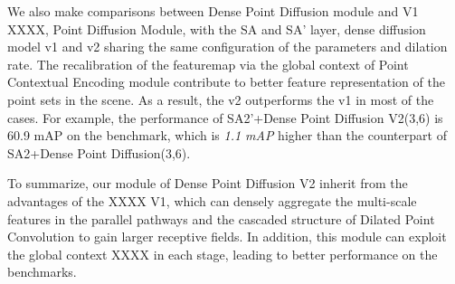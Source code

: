 \documentclass[runningheads]{llncs}
\begin{document}
We also make comparisons between Dense Point Diffusion module and V1 XXXX, Point Diffusion Module, with the SA and SA' layer, dense diffusion model v1 and v2 sharing the same configuration of the parameters and dilation rate. The  recalibration of  the  featuremap via the global context of  Point Contextual Encoding module  contribute to better feature representation of the point sets in the scene. As a result, the v2 outperforms the v1 in most of the cases. For example, the performance of SA2'+Dense Point Diffusion V2(3,6) is 60.9 mAP on the benchmark, which is \emph{1.1 mAP} higher than the counterpart of SA2+Dense Point Diffusion(3,6).





To summarize, our module of Dense Point Diffusion V2 inherit  from the advantages  of the XXXX V1,  which can densely aggregate the multi-scale features in the parallel pathways and the cascaded structure of Dilated Point Convolution to gain larger receptive fields. In addition, this module can exploit the global context XXXX in each stage, leading to better performance on the benchmarks.

\end{document}
